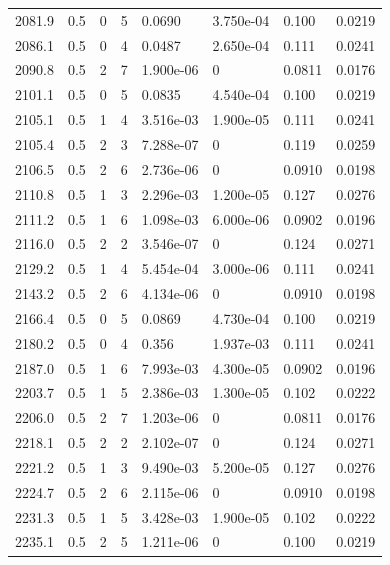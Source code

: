 \documentclass[preview]{standalone}
\begin{document}
{{{{{\begin{tabular}{L{1.2cm}C{1.2cm} C{0.3cm}C{0.5cm} C{1.4cm}C{1.4cm} C{1.4cm}C{1.4cm}}
  2081.9  &   0.5  & 0     &  5 &  0.0690  & 3.750e-04  & 0.100 &  0.0219   \\ 
  2086.1  &   0.5  & 0     &  4 &  0.0487  & 2.650e-04  & 0.111 &  0.0241   \\ 
  2090.8  &   0.5  & 2     &  7 &  1.900e-06  & 0  & 0.0811 &  0.0176   \\ 
  2101.1  &   0.5  & 0     &  5 &  0.0835  & 4.540e-04  & 0.100 &  0.0219   \\ 
  2105.1  &   0.5  & 1     &  4 &  3.516e-03  & 1.900e-05  & 0.111 &  0.0241   \\ 
  2105.4  &   0.5  & 2     &  3 &  7.288e-07  & 0  & 0.119 &  0.0259   \\ 
  2106.5  &   0.5  & 2     &  6 &  2.736e-06  & 0  & 0.0910 &  0.0198   \\ 
  2110.8  &   0.5  & 1     &  3 &  2.296e-03  & 1.200e-05  & 0.127 &  0.0276   \\ 
  2111.2  &   0.5  & 1     &  6 &  1.098e-03  & 6.000e-06  & 0.0902 &  0.0196   \\ 
  2116.0  &   0.5  & 2     &  2 &  3.546e-07  & 0  & 0.124 &  0.0271   \\ 
  2129.2  &   0.5  & 1     &  4 &  5.454e-04  & 3.000e-06  & 0.111 &  0.0241   \\ 
  2143.2  &   0.5  & 2     &  6 &  4.134e-06  & 0  & 0.0910 &  0.0198   \\ 
  2166.4  &   0.5  & 0     &  5 &  0.0869  & 4.730e-04  & 0.100 &  0.0219   \\ 
  2180.2  &   0.5  & 0     &  4 &  0.356  & 1.937e-03  & 0.111 &  0.0241   \\ 
  2187.0  &   0.5  & 1     &  6 &  7.993e-03  & 4.300e-05  & 0.0902 &  0.0196   \\ 
  2203.7  &   0.5  & 1     &  5 &  2.386e-03  & 1.300e-05  & 0.102 &  0.0222   \\ 
  2206.0  &   0.5  & 2     &  7 &  1.203e-06  & 0  & 0.0811 &  0.0176   \\ 
  2218.1  &   0.5  & 2     &  2 &  2.102e-07  & 0  & 0.124 &  0.0271   \\ 
  2221.2  &   0.5  & 1     &  3 &  9.490e-03  & 5.200e-05  & 0.127 &  0.0276   \\ 
  2224.7  &   0.5  & 2     &  6 &  2.115e-06  & 0  & 0.0910 &  0.0198   \\ 
  2231.3  &   0.5  & 1     &  5 &  3.428e-03  & 1.900e-05  & 0.102 &  0.0222   \\ 
  2235.1  &   0.5  & 2     &  5 &  1.211e-06  & 0  & 0.100 &  0.0219   \\ 

\end{tabular}}}}}}
\end{document}
